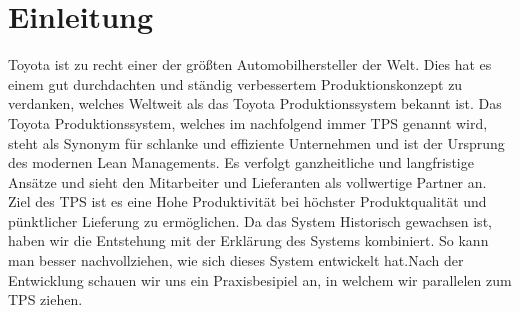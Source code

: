 \documentclass[01_Einleitung.tex]{subfiles}
\begin{document}
\chapter{Einleitung}
\label{chap:Einleitung}
Toyota ist zu recht einer der größten Automobilhersteller der Welt. Dies hat es einem gut durchdachten und ständig verbessertem Produktionskonzept zu verdanken, welches Weltweit als das Toyota Produktionssystem bekannt ist. Das Toyota Produktionssystem, welches im nachfolgend immer TPS genannt wird, steht als Synonym für schlanke und effiziente Unternehmen und ist der Ursprung des modernen Lean Managements. Es verfolgt ganzheitliche und langfristige Ansätze und sieht den Mitarbeiter und Lieferanten als vollwertige Partner an. Ziel des TPS ist es eine Hohe Produktivität bei höchster Produktqualität und pünktlicher Lieferung zu ermöglichen. \newline Da das System Historisch gewachsen ist, haben wir die Entstehung mit der Erklärung des Systems kombiniert. So kann man besser nachvollziehen, wie sich dieses System entwickelt hat.\newline Nach der Entwicklung schauen wir uns ein Praxisbesipiel an, in welchem wir parallelen zum TPS ziehen.
\end{document}
